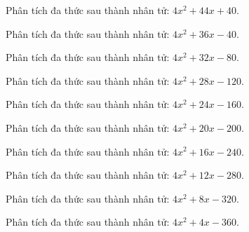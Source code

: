 \begin{bt}
	Phân tích đa thức sau thành nhân tử: $4 x^2 + 44 x + 40$.
\end{bt}
\begin{bt}
	Phân tích đa thức sau thành nhân tử: $4 x^2 + 36 x - 40$.
\end{bt}
\begin{bt}
	Phân tích đa thức sau thành nhân tử: $4 x^2 + 32 x - 80$.
\end{bt}
\begin{bt}
	Phân tích đa thức sau thành nhân tử: $4 x^2 + 28 x - 120$.
\end{bt}
\begin{bt}
	Phân tích đa thức sau thành nhân tử: $4 x^2 + 24 x - 160$.
\end{bt}
\begin{bt}
	Phân tích đa thức sau thành nhân tử: $4 x^2 + 20 x - 200$.
\end{bt}
\begin{bt}
	Phân tích đa thức sau thành nhân tử: $4 x^2 + 16 x - 240$.
\end{bt}
\begin{bt}
	Phân tích đa thức sau thành nhân tử: $4 x^2 + 12 x - 280$.
\end{bt}
\begin{bt}
	Phân tích đa thức sau thành nhân tử: $4 x^2 + 8 x - 320$.
\end{bt}
\begin{bt}
	Phân tích đa thức sau thành nhân tử: $4 x^2 + 4 x - 360$.
\end{bt}
